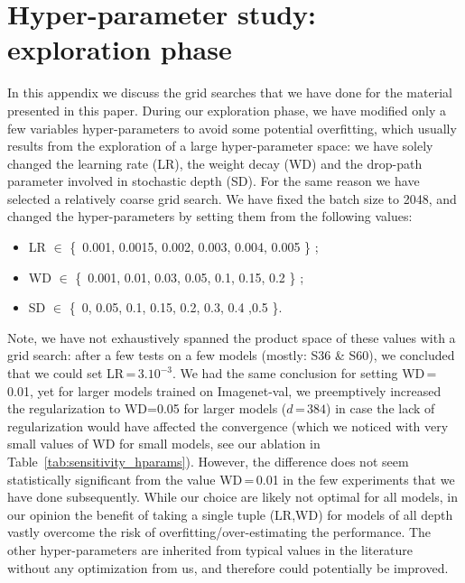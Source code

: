 \appendix\newpage





\section{Hyper-parameter study: exploration phase}
\label{sec:apdx_explo}
In this appendix we discuss the grid searches that we have done for the material presented in this paper. 
During our exploration phase, we have modified only a few variables hyper-parameters to avoid some potential overfitting, which usually results from the exploration of a large hyper-parameter space: we have solely changed the learning rate (LR), the weight decay (WD) and the drop-path parameter involved in stochastic depth (SD). 
For the same reason we have selected a relatively coarse grid search.
% 
We have fixed the batch size to 2048, and changed the hyper-parameters by setting them from the following values:
\begin{itemize}
    \item LR $\in$ \{\ 0.001, 0.0015, 0.002, 0.003, 0.004, 0.005 \} ;
    \item WD $\in$ \{\ 0.001, 0.01, 0.03, 0.05, 0.1, 0.15, 0.2 \} ; 
    \item SD $\in$ \{\ 0, 0.05, 0.1, 0.15, 0.2, 0.3, 0.4 ,0.5 \}.
\end{itemize}

Note, we have not exhaustively spanned the product space of these values with a grid search: after a few tests on a few models (mostly: S36 \& S60), we concluded that we could set LR\,=\,$3.10^{-3}$. We had the same conclusion for setting WD\,=\,0.01, yet for larger models trained on Imagenet-val, we preemptively increased the regularization to WD=0.05 for larger models  ($d$\,=\,$384$) in case the lack of regularization would have affected the convergence (which we  noticed with very small values of WD for small models, see our ablation in Table~\ref{tab:sensitivity_hparams}). However, the difference does not seem statistically significant from the value WD\,=\,0.01 in the few experiments that we have done subsequently. While our choice are likely not optimal for all models, in our opinion the benefit of taking a single tuple (LR,WD) for models of all depth vastly overcome the risk of overfitting/over-estimating the performance. 
The other hyper-parameters are inherited from typical values in the literature~\cite{Touvron2020TrainingDI,wightman2021resnet} without any optimization from us, and therefore could potentially be improved. 

